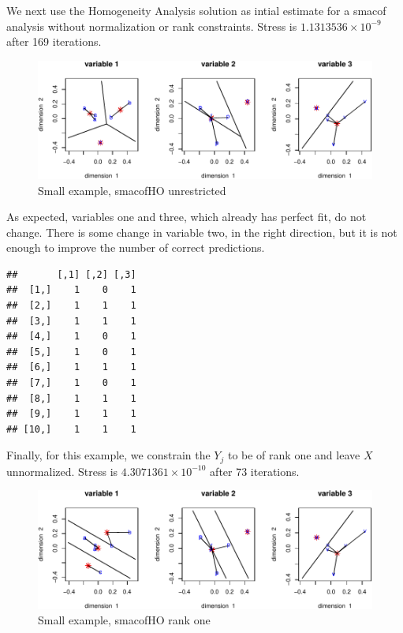 \documentclass[
  12pt,
]{article}
\begin{document}
We next use the Homogeneity Analysis solution as intial estimate
for a smacof analysis without normalization or rank constraints.
Stress is \ensuremath{1.1313536\times 10^{-9}} after 169 iterations.

\begin{figure}

{\centering \includegraphics{smacofHO_files/figure-latex/smallplot00-1} 

}

\caption{Small example, smacofHO unrestricted}\label{fig:smallplot00}
\end{figure}

As expected, variables one and three, which already has perfect fit, do not change. There is some change in variable two, in the right
direction, but it is not enough to improve the number of correct
predictions.

\begin{verbatim}
##       [,1] [,2] [,3]
##  [1,]    1    0    1
##  [2,]    1    1    1
##  [3,]    1    1    1
##  [4,]    1    0    1
##  [5,]    1    0    1
##  [6,]    1    1    1
##  [7,]    1    0    1
##  [8,]    1    1    1
##  [9,]    1    1    1
## [10,]    1    1    1
\end{verbatim}

Finally, for this example, we constrain the \(Y_j\) to be of rank one
and leave \(X\) unnormalized. Stress is \ensuremath{4.3071361\times 10^{-10}} after 73 iterations.

\begin{figure}

{\centering \includegraphics{smacofHO_files/figure-latex/smallplot10-1} 

}

\caption{Small example, smacofHO rank one}\label{fig:smallplot10}
\end{figure}
\end{document}
